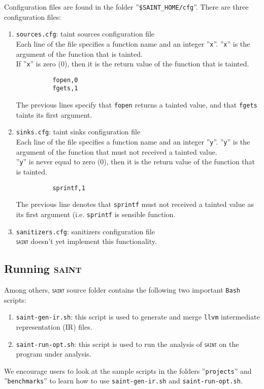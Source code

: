 \documentclass[12pt,onecolumn,a4paper]{article}
\newcommand{\saint}{\texttt{\textsc{saint}}\xspace}
\newcommand{\tool}[1]{\texttt{#1}\xspace}
\begin{document}
Configuration files are found in the folder ''\texttt{\$SAINT\_HOME/cfg}''.
There are three configuration files:
\begin{enumerate}[1)]
	\item \texttt{sources.cfg}: taint sources configuration file\\
		  Each line of the file specifies a function name and an integer ''\texttt{x}''.
		  ''\texttt{x}'' is the argument of the function that is tainted.\\
		  If ''\texttt{x}'' is zero (0), then it is the return value of the function that is tainted.
		  \begin{verbatim}
		  fopen,0
		  fgets,1		  
		  \end{verbatim}
		  The previous lines specify that \texttt{fopen} returns a tainted value, and
		  that \texttt{fgets} taints its first argument. 
	\item \texttt{sinks.cfg}: taint sinks configuration file\\
		  Each line of the file specifies a function name and an integer ''\texttt{y}''.
		  ''\texttt{y}'' is the argument of the function that must not received a tainted value.\\
		  ''\texttt{y}'' is never equal to zero (0), then it is the return
		  value of the function that is tainted.
		  \begin{verbatim}
		  sprintf,1	  
		  \end{verbatim}
		  The previous line denotes that \texttt{sprintf} must not received
		  a tainted value as its first argument (i.e. \texttt{sprintf} is 
		  sensible function.
	\item \texttt{sanitizers.cfg}: sanitizers configuration file\\
		  \saint doesn't yet implement this functionality.
\end{enumerate}

\subsection{Running \textsc{saint}}
Among others, \saint source folder contains the following two important
\texttt{Bash} scripts:
\begin{enumerate}[1)]
	\item \texttt{saint-gen-ir.sh}: this script is used to generate and
		merge \tool{llvm} intermediate representation (IR) files. 
	
	\item \texttt{saint-run-opt.sh}: this script is used to run the analysis of
		\saint on the program under analysis.
\end{enumerate}

We encourage users to look at the sample scripts in the
folders ''\texttt{projects}'' and ''\texttt{benchmarks}''
to learn how to use \texttt{saint-gen-ir.sh} and
\texttt{saint-run-opt.sh}.
		



\end{document}
